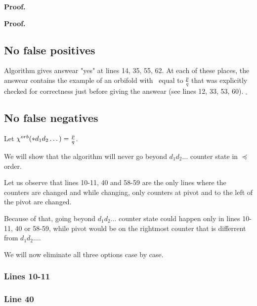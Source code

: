 \begin{lemma}

\end{lemma}
\textbf{Proof.} \\

\begin{lemma}

\end{lemma}
\textbf{Proof.} \\

\subsection{No false positives}
Algorithm gives answear "yes" at lines 14, 35, 55, 62. At each of these places, 
the answear contains the example of an orbifold with \Eoc\ equal to $\frac{p}{q}$ that was 
explicitly checked for correctness just before giving the answear (see lines 12, 33, 53, 60). 
$_\square$    
\subsection{No false negatives}
Let ${\chi^{orb}(*d_1d_2\dots)} = \frac{p}{q}$. 

%

We will show that the algorithm will never 
go beyond $d_1d_2\dots$ counter state in $\preceq$ order. 

Let us observe that lines 10-11, 40 and 58-59 are the only lines where 
the counters are changed and while changing, 
only counters 
at pivot and to the left of the pivot are changed. 

Because of that, going beyond $d_1d_2\dots$ counter state 
could happen only in lines 10-11, 40 or 58-59, while pivot would be 
on the rightmost counter that is differrent from $d_1d_2\dots$. 

We will now eliminate all three options case by case. 
\subsubsection{Lines 10-11}
\subsubsection{Line 40}
